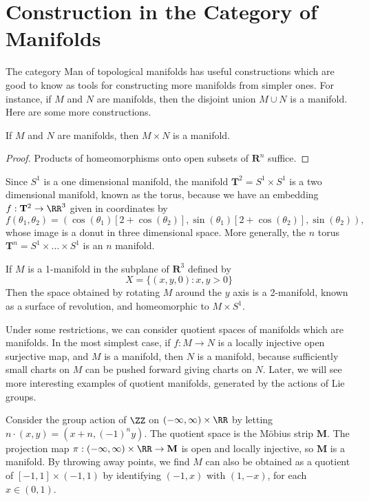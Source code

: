 \section{Construction in the Category of Manifolds}

The category {\sf Man} of topological manifolds has useful constructions which are good to know as tools for constructing more manifolds from simpler ones. For instance, if $M$ and $N$ are manifolds, then the disjoint union $M \cup N$ is a manifold. Here are some more constructions.

\begin{theorem}
    If $M$ and $N$ are manifolds, then $M \times N$ is a manifold.
\end{theorem}
\begin{proof}
    Products of homeomorphisms onto open subsets of $\mathbf{R}^n$ suffice.
\end{proof}

\begin{example}
    Since $S^1$ is a one dimensional manifold, the manifold $\mathbf{T}^2 = S^1 \times S^1$ is a two dimensional manifold, known as the torus, because we have an embedding $f: \mathbf{T}^2 \to \RR^3$ given in coordinates by
    \[ f(\theta_1,\theta_2) = (\cos(\theta_1) [2 + \cos(\theta_2)],\sin(\theta_1) [2 + \cos(\theta_2)], \sin(\theta_2)), \]
    whose image is a donut in three dimensional space. More generally, the $n$ torus $\mathbf{T}^n = S^1 \times \dots \times S^1$ is an $n$ manifold.
\end{example}

\begin{example}
    If $M$ is a 1-manifold in the subplane of $\mathbf{R}^3$ defined by
    \[ X = \{ (x,y,0): x,y > 0 \} \]
    Then the space obtained by rotating $M$ around the $y$ axis is a 2-manifold, known as a surface of revolution, and homeomorphic to $M \times S^1$.
\end{example}

Under some restrictions, we can consider quotient spaces of manifolds which are manifolds. In the most simplest case, if $f: M \to N$ is a locally injective open surjective map, and $M$ is a manifold, then $N$ is a manifold, because sufficiently small charts on $M$ can be pushed forward giving charts on $N$. Later, we will see more interesting examples of quotient manifolds, generated by the actions of Lie groups.

\begin{example}
    Consider the group action of $\ZZ$ on $(-\infty,\infty) \times \RR$ by letting $n \cdot (x,y) = (x + n, (-1)^n y)$. The quotient space is the M\"{o}bius strip $\mathbf{M}$. The projection map $\pi: (-\infty,\infty) \times \RR \to \mathbf{M}$ is open and locally injective, so $\mathbf{M}$ is a manifold. By throwing away points, we find $M$ can also be obtained as a quotient of $[-1,1] \times (-1,1)$ by identifying $(-1,x)$ with $(1,-x)$, for each $x \in (0,1)$.
\end{example}

